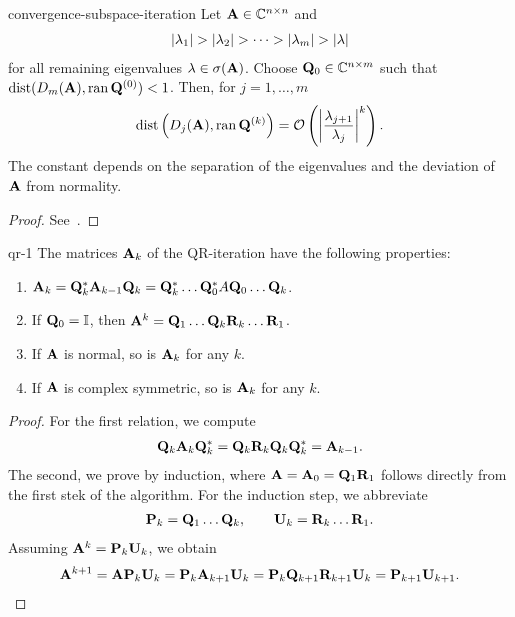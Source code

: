 \begin{Theorem}{convergence-subspace-iteration}
  Let $\mata\in\Cnn$ and
  \begin{gather}
    \abs{\lambda_1} >
    \abs{\lambda_2}>\dots>\abs{\lambda_m}>\abs{\lambda}
  \end{gather}
  for all remaining eigenvalues $\lambda\in\sigma(\mata)$. Choose
  $\matq_0 \in \C^{n\times m}$ such that
  $\dist(D_m(\mata),\ran{\matq^{(0)}}) < 1$. Then, for $j=1,\dots,m$
  \begin{gather}
    \dist\left(D_j(\mata),\ran{\matq^{(k)}}\right)
    = \bigo \left(\abs*{\frac{\lambda_{j+1}}{\lambda_j}}^k\right).
  \end{gather}
  The constant depends on the separation of the eigenvalues and the deviation of $\mata$ from normality.
\end{Theorem}

\begin{proof}
  See~\cite[Theorem 7.3-1]{GolubVanLoan83}.
\end{proof}

\begin{Lemma}{qr-1}
  The matrices $\mata_k$ of the QR-iteration have the following properties:
  \begin{enumerate}
  \item $\mata_{k} = \matq_k^*\mata_{k-1}\matq_k = \matq_k^*\dots\matq_0^*A\matq_0\dots\matq_k$.
  \item If $\matq_0=\id$, then $\mata^k=\matq_1\dots\matq_k\matr_k\dots\matr_1$.
  \item If $\mata$ is normal, so is $\mata_k$ for any $k$.
  \item If $\mata$ is complex symmetric, so is $\mata_k$ for any $k$.
  \end{enumerate}
\end{Lemma}

\begin{proof}
  For the first relation, we compute
  \begin{gather}
    \matq_k\mata_{k}\matq_k^* = \matq_k\matr_k\matq_k\matq_k^* = \mata_{k-1}.
  \end{gather}
  The second, we prove by induction, where
  $\mata = \mata_0 = \matq_1\matr_1$ follows directly from the first
  stek of the algorithm. For the induction step, we abbreviate
  \begin{gather}
    \matp_k = \matq_1\dots\matq_k,\qquad \matu_k = \matr_k\dots\matr_1.
  \end{gather}
  Assuming $\mata^k = \matp_k\matu_k$, we obtain
  \begin{gather}
    \mata^{k+1} = \mata\matp_k\matu_k = \matp_k\mata_{k+1}\matu_k
    = \matp_k\matq_{k+1}\matr_{k+1}\matu_k = \matp_{k+1}\matu_{k+1}.
  \end{gather}
\end{proof}
